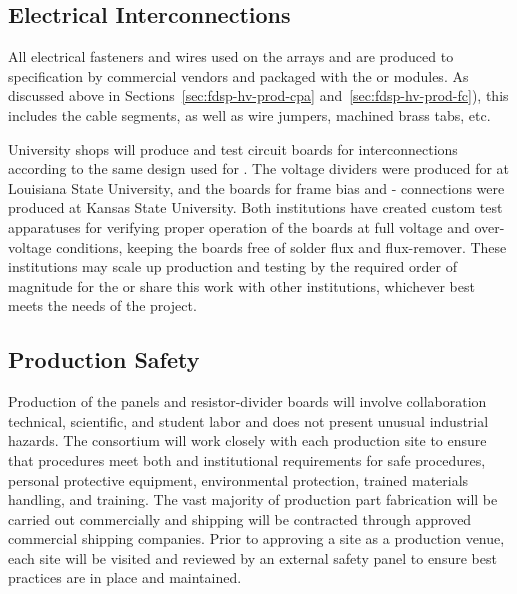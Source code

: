 \subsection{Electrical Interconnections}
\label{sec:fdsp-hv-prod-interconnect}

All electrical fasteners and wires used on the  arrays and  are produced
to specification by commercial vendors and packaged with the  or  modules.  
As discussed above in Sections~\ref{sec:fdsp-hv-prod-cpa} and~\ref{sec:fdsp-hv-prod-fc}), 
this includes the  cable segments, as well as wire jumpers, machined brass
tabs, etc.

University shops will produce and test circuit boards for %
 interconnections according to the same design used for .  The  voltage dividers were produced for  at Louisiana State University, and the boards for  frame bias and - connections were produced at Kansas State University.
Both institutions have created custom test apparatuses for verifying proper operation of the boards at full voltage and over-voltage conditions, keeping the boards free of solder flux and flux-remover.  These institutions may scale up production and testing by the required order of magnitude for the  or share this work with other institutions, whichever best meets the needs of the project. %

\subsection{Production Safety}
\label{sec:fdsp-hv-prod-safety}

Production of the  panels and resistor-divider boards will involve collaboration technical, scientific, and student labor and  does not present unusual industrial hazards. The  consortium will work closely with each production site to ensure that procedures meet both  and institutional requirements for safe procedures, personal protective equipment, environmental protection, trained materials handling, and training. The vast majority of production part fabrication will be carried out commercially and shipping will be contracted through approved commercial shipping companies. Prior to approving a site as a production venue, each site will be visited and reviewed by an external safety panel to ensure best practices are in place and maintained. 

